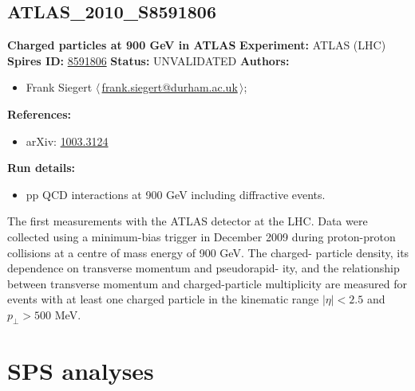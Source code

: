 \subsection[ATLAS\_2010\_S8591806]{ATLAS\_2010\_S8591806\,\cite{Collaboration:2010rd}}
\textbf{Charged particles at 900 GeV in ATLAS}\newline
\textbf{Experiment:} ATLAS (LHC) \newline
\textbf{Spires ID:} \href{http://www.slac.stanford.edu/spires/find/hep/www?rawcmd=key+8591806}{8591806}\newline
\textbf{Status:} UNVALIDATED\newline
\textbf{Authors:}
\begin{itemize}
  \item Frank Siegert $\langle\,$\href{mailto:frank.siegert@durham.ac.uk}{frank.siegert@durham.ac.uk}$\,\rangle$;
\end{itemize}
\textbf{References:}
\begin{itemize}
  \item arXiv: \href{http://arxiv.org/abs/1003.3124}{1003.3124}
\end{itemize}
\textbf{Run details:}
\begin{itemize}

  \item pp QCD interactions at 900 GeV including diffractive events.\end{itemize}

\noindent The ﬁrst measurements with the ATLAS detector at the LHC. Data were collected using a minimum-bias trigger in December 2009 during proton-proton collisions at a centre of mass energy of 900 GeV. The charged- particle density, its dependence on transverse momentum and pseudorapid- ity, and the relationship between transverse momentum and charged-particle multiplicity are measured for events with at least one charged particle in the kinematic range $|\eta| < 2.5$ and $p_\perp > 500$ MeV.

\clearpage


\section{SPS analyses}
